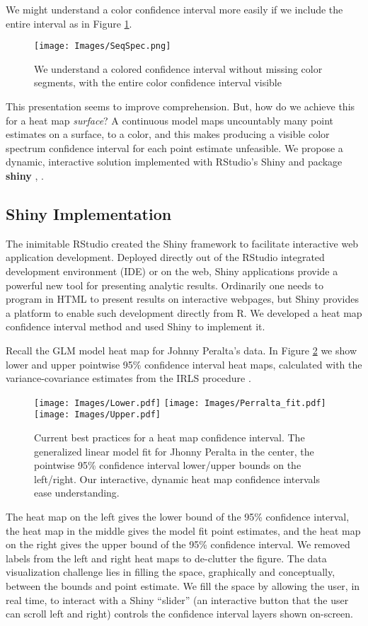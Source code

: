 We might understand a color confidence interval more easily if we include the entire interval as in Figure \ref{fig:specint}.
  \begin{figure}[H]
  \centering
	\texttt{[image: Images/SeqSpec.png]}
	\caption{We understand a colored confidence interval without missing color segments, with the entire color confidence interval visible}
	\label{fig:specint}
	\end{figure}
This presentation seems to improve comprehension. But, how do we achieve this for a heat map {\it surface}? A continuous model maps uncountably many point estimates on a surface, to a color, and this makes producing a visible color spectrum confidence interval for each point estimate unfeasible. We propose a dynamic, interactive solution implemented with RStudio's Shiny and package {\bf shiny} \citep{Shiny}, \citep{RStudio}.

\subsection{Shiny Implementation}
The inimitable RStudio created the Shiny framework to facilitate interactive web application development. Deployed directly out of the RStudio integrated development environment (IDE) \citep{IDE} or on the web, Shiny applications provide a powerful new tool for presenting analytic results. Ordinarily one needs to program in HTML to present results on interactive webpages, but Shiny provides a platform to enable such development directly from R. We developed a heat map confidence interval method and used Shiny to implement it.

Recall the GLM model heat map for Johnny Peralta's data. In Figure \ref{fig:LPU} we show lower and upper pointwise 95\% confidence interval heat maps, calculated with the variance-covariance estimates from the IRLS procedure \citep{Myers2012}.
  \begin{figure}[H]
	\centering
	\texttt{[image: Images/Lower.pdf]}
	\texttt{[image: Images/Perralta\_fit.pdf]}
	\texttt{[image: Images/Upper.pdf]}
	\caption{Current best practices for a heat map confidence interval. The generalized linear model fit for Jhonny Peralta in the center, the pointwise 95\% confidence interval lower/upper bounds on the left/right. Our interactive, dynamic heat map confidence intervals ease understanding.}
	\label{fig:LPU}
	\end{figure}
The heat map on the left gives the lower bound of the 95\% confidence interval, the heat map in the middle gives the model fit point estimates, and the heat map on the right gives the upper bound of the 95\% confidence interval. We removed labels from the left and right heat maps to de-clutter the figure. The data visualization challenge lies in filling the space, graphically and conceptually, between the bounds and point estimate. We fill the space by allowing the user, in real time, to interact with a Shiny ``slider'' (an interactive button that the user can scroll left and right) controls the confidence interval layers shown on-screen. 

